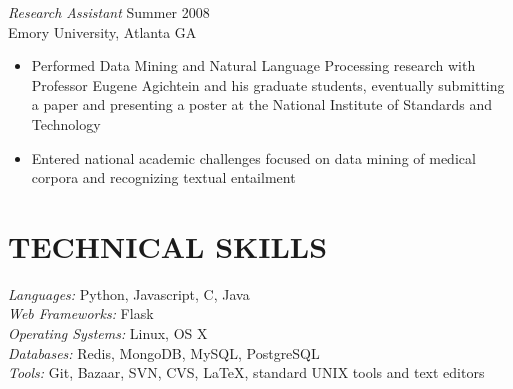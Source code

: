 \documentclass[line,margin]{res}
\begin{document}
\begin{resume}
        {\sl Research Assistant} \hfill Summer 2008 \\
        Emory University, Atlanta GA
        \begin{itemize}
        \item Performed Data Mining and Natural Language Processing research
          with Professor Eugene Agichtein and his graduate students,
          eventually submitting a paper and presenting a poster at the National
          Institute of Standards and Technology
        \item Entered national academic challenges focused on data
          mining of medical corpora and recognizing textual entailment
        \end{itemize}

\section{TECHNICAL SKILLS}
        {\sl Languages:} Python, Javascript, C, Java \\
        {\sl Web Frameworks:} Flask \\
        {\sl Operating Systems:} Linux, OS X\\
        {\sl Databases:} Redis, MongoDB, MySQL, PostgreSQL \\
        {\sl Tools:} Git, Bazaar, SVN, CVS, \LaTeX, standard UNIX tools and
        text editors 

\end{resume}
\end{document}
